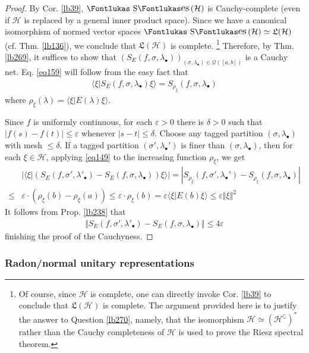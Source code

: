 \documentclass[12pt,b5paper,notitlepage]{article}
\theoremstyle{definition}
\theoremstyle{plain}
\DeclareMathOperator{\Ses}{\text{\Fontlukas S}\text{\kern -0pt {\Fontlukas\large es}}\,}
\newcommand{\fk}{\mathfrak}
\newcommand{\mc}{\mathcal}
\newcommand{\bk}[1]{\langle {#1}\rangle}
\newcommand{\bigbk}[1]{\big\langle {#1}\big\rangle}
\newcommand{\Co}{\complement}
\newcommand{\blt}{\bullet}
\newcommand{\eps}{\varepsilon}
\newcommand{\MH}{\mathcal H}
\numberwithin{equation}{section}
\begin{document}
\begin{proof}
By Cor. \ref{lb39}, $\Ses(\MH)$ is Cauchy-complete (even if $\MH$ is replaced by a general inner product space). Since we have a canonical isomorphism of normed vector spaces $\Ses(\MH)\simeq\fk L(\MH)$ (cf. Thm. \ref{lb136}), we conclude that $\fk L(\MH)$ is complete. \footnote{Of course, since $\MH$ is complete, one can directly invoke Cor. \ref{lb39} to conclude that $\fk L(\MH)$ is complete. The argument provided here is to justify the answer to Question \ref{lb270}, namely, that the isomorphism $\MH\simeq(\MH^\Co)^*$ rather than the Cauchy completeness of $\MH$ is used to prove the Riesz spectral theorem.} Therefore, by Thm. \ref{lb269}, it suffices to show that $(S_E(f,\sigma,\lambda_\blt))_{(\sigma,\lambda_\blt)\in\mc Q([a,b])}$ is a Cauchy net. Eq. \eqref{eq159} will follow from the easy fact that
\begin{align}
\bigbk{\xi\big|S_E(f,\sigma,\lambda_\blt)\xi}=S_{\rho_\xi}(f,\sigma,\lambda_\blt)
\end{align}
where $\rho_\xi(\lambda)=\bk{\xi|E(\lambda)\xi}$.



Since $f$ is uniformly continuous, for each $\eps>0$ there is $\delta>0$ such that $|f(s)-f(t)|\leq\eps$ whenever $|s-t|\leq\delta$. Choose any tagged partition $(\sigma,\lambda_\blt)$ with mesh $\leq\delta$. If a tagged partition $(\sigma',\lambda_\blt')$ is finer than $(\sigma,\lambda_\blt)$, then for each $\xi\in\MH$, applying \eqref{eq149} to the increasing function $\rho_\xi$, we get
\begin{align*}
&\Big|\bigbk{\xi\big|(S_E(f,\sigma',\lambda'_\blt)-S_E(f,\sigma,\lambda_\blt))\xi}\Big|=|S_{\rho_\xi}(f,\sigma',\lambda_\blt')-S_{\rho_\xi}(f,\sigma,\lambda_\blt)|\\
\leq& \eps\cdot(\rho_\xi(b)-\rho_\xi(a))\leq\eps\cdot\rho_\xi(b)=\eps\bk{\xi|E(b)\xi}\leq\eps\Vert\xi\Vert^2
\end{align*}
It follows from Prop. \ref{lb238} that
\begin{align*}
\Vert S_E(f,\sigma',\lambda'_\blt)-S_E(f,\sigma,\lambda_\blt)\Vert\leq 4\eps
\end{align*}
finishing the proof of the Cauchyness.
\end{proof}



\subsubsection{Radon/normal unitary representations}
\end{document}

